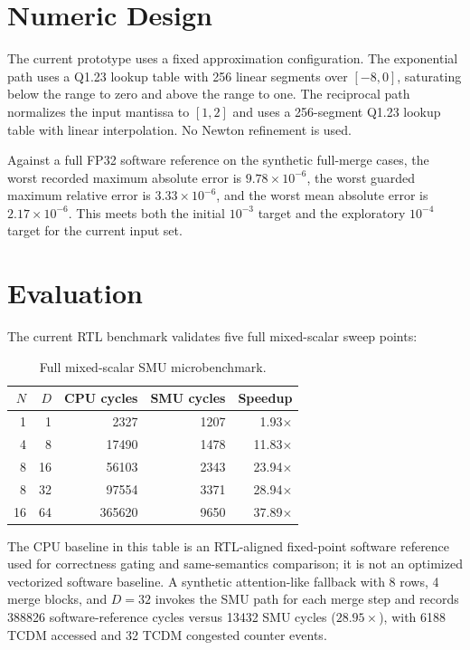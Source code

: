 \documentclass[conference]{IEEEtran}
\begin{document}
\section{Numeric Design}

The current prototype uses a fixed approximation configuration. The
exponential path uses a Q1.23 lookup table with 256 linear segments over
$[-8,0]$, saturating below the range to zero and above the range to one. The
reciprocal path normalizes the input mantissa to $[1,2]$ and uses a 256-segment
Q1.23 lookup table with linear interpolation. No Newton refinement is used.

Against a full FP32 software reference on the synthetic full-merge cases, the
worst recorded maximum absolute error is $9.78\times10^{-6}$, the worst guarded
maximum relative error is $3.33\times10^{-6}$, and the worst mean absolute
error is $2.17\times10^{-6}$. This meets both the initial $10^{-3}$ target and
the exploratory $10^{-4}$ target for the current input set.

\section{Evaluation}

The current RTL benchmark validates five full mixed-scalar sweep points:

\begin{table}[h]
\centering
\caption{Full mixed-scalar SMU microbenchmark.}
\begin{tabular}{rrrrr}
\toprule
$N$ & $D$ & CPU cycles & SMU cycles & Speedup \\
\midrule
1 & 1 & 2327 & 1207 & 1.93$\times$ \\
4 & 8 & 17490 & 1478 & 11.83$\times$ \\
8 & 16 & 56103 & 2343 & 23.94$\times$ \\
8 & 32 & 97554 & 3371 & 28.94$\times$ \\
16 & 64 & 365620 & 9650 & 37.89$\times$ \\
\bottomrule
\end{tabular}
\end{table}

The CPU baseline in this table is an RTL-aligned fixed-point software reference
used for correctness gating and same-semantics comparison; it is not an
optimized vectorized software baseline. A synthetic attention-like fallback
with 8 rows, 4 merge blocks, and $D=32$ invokes the SMU path for each merge
step and records 388826 software-reference cycles versus 13432 SMU cycles
($28.95\times$), with 6188 TCDM accessed and 32 TCDM congested counter events.
\end{document}
